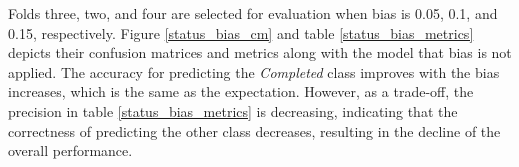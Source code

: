 \documentclass[12pt,twoside]{report}
\begin{document}
Folds three, two, and four are selected for evaluation when bias is 0.05, 0.1, and 0.15, respectively. Figure \ref{status_bias_cm} and table \ref{status_bias_metrics} depicts their confusion matrices and metrics along with the model that bias is not applied. The accuracy for predicting the \textit{Completed} class improves with the bias increases, which is the same as the expectation. However, as a trade-off, the precision in table \ref{status_bias_metrics} is decreasing, indicating that the correctness of predicting the other class decreases, resulting in the decline of the overall performance.

\begin{figure}[!htbp]
	\centering
	\hfil
	\hfill

\end{figure}
\end{document}
